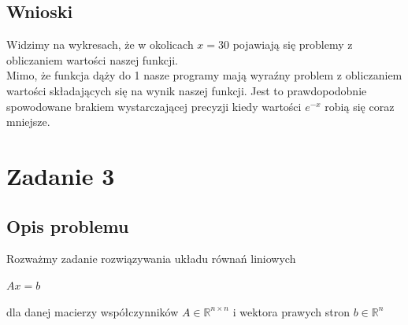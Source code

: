 \documentclass{article}
\begin{document}
\subsection*{Wnioski}
	Widzimy na wykresach, że w okolicach $x = 30$ pojawiają się problemy z obliczaniem wartości naszej funkcji. \\
	Mimo, że funkcja dąży do 1 nasze programy mają wyraźny problem z obliczaniem wartości składających się na wynik naszej funkcji.
	Jest to prawdopodobnie spowodowane brakiem wystarczającej precyzji kiedy wartości $e^{-x}$ robią się coraz mniejsze.

\section*{Zadanie 3}
\subsection*{Opis problemu}
	Rozważmy zadanie rozwiązywania układu równań liniowych \\
	\centerline{$Ax = b$}
	dla danej macierzy współczynników $A \in \mathbb{R}^{n\times n}$ i wektora prawych stron $b \in \mathbb{R}^{n}$
\end{document}
